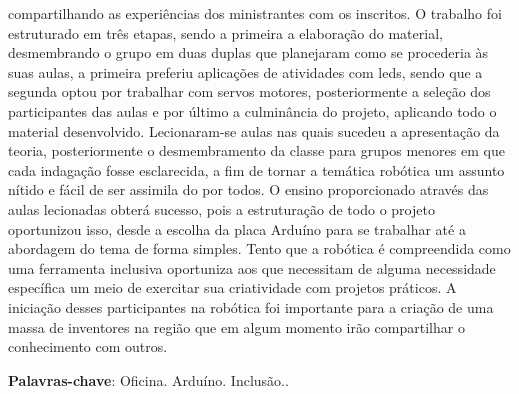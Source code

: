 \documentclass[article,12pt,onesidea,4paper,english,brazil]{abntex2}
\begin{document}
	compartilhando as experiências dos ministrantes com os inscritos. O trabalho foi estruturado em três etapas, sendo a primeira a elaboração do material, desmembrando o grupo em duas duplas que planejaram como se procederia às suas aulas, a primeira preferiu aplicações de atividades com leds, sendo que a segunda optou por trabalhar com servos motores, posteriormente a seleção dos participantes das aulas e por último a culminância do projeto, aplicando todo o material desenvolvido. Lecionaram-se aulas nas quais sucedeu a apresentação da teoria, posteriormente o desmembramento da classe para grupos menores em que cada indagação fosse esclarecida, a fim de tornar a temática robótica um assunto nítido e fácil de ser assimila do por todos. O ensino proporcionado através das aulas lecionadas obterá sucesso, pois a estruturação de todo o projeto oportunizou isso, desde a escolha da placa Arduíno para se trabalhar até a abordagem do tema de forma simples. Tento que a robótica é compreendida como uma ferramenta inclusiva oportuniza aos que necessitam de alguma necessidade específica um meio de exercitar sua criatividade com projetos práticos. A iniciação desses participantes na robótica foi importante para a criação de uma massa de inventores na região que em algum momento irão compartilhar o conhecimento com outros.
	
	
	\vspace{\onelineskip}
	
	\noindent
	\textbf{Palavras-chave}: Oficina. Arduíno. Inclusão..
	
\end{document}
